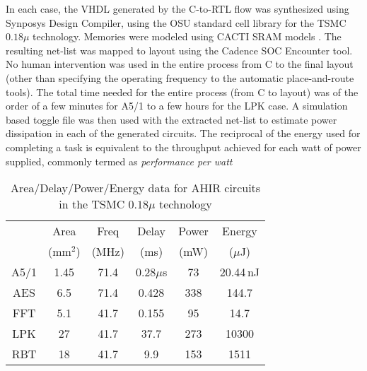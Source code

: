 \documentclass[conference]{IEEEtran}
\begin{document}
In each case, the VHDL generated by
the C-to-RTL flow was synthesized using Synposys Design Compiler,
using the OSU standard cell library \cite{OSU} for the TSMC $0.18\mu$ 
%
%
technology.  
Memories were modeled using CACTI SRAM models \cite{CACTI}. 
The resulting net-list was mapped to layout using
the Cadence SOC Encounter tool.  No human intervention was
used in the entire process from C to the final layout (other
than specifying the operating frequency to the automatic place-and-route
tools).   The total time needed for the entire process (from C to layout)
was of the order of a few minutes for A5/1 to a few hours for the LPK
case.
%
%
A simulation based toggle file was then used with the extracted
net-list to estimate power dissipation in each of the generated
circuits.
The reciprocal of the energy used for completing a task is equivalent to
the throughput achieved for each watt of power supplied, commonly
termed as {\em performance per watt} 
%

\begin{table}[htb]
  \centering
  \caption{Area/Delay/Power/Energy data for AHIR circuits in the TSMC $0.18\mu$ technology}
  \label{table:tsmc-180nm-data}
  \renewcommand\arraystretch{1.2}
  \setlength{\tabcolsep}{1ex}
  \begin{tabular}{c|c|c|c|c|c}
    \hline
    & Area & Freq & Delay & Power & Energy \\
    & (mm$^2$) & (MHz) & (ms) & (mW) & ($\mu$J) \\
    \hline
    \hline
    A5/1 & 1.45 & 71.4 & 0.28$\mu$s & 73 & 20.44\,nJ \\
    \hline
    AES & 6.5 & 71.4 & 0.428 & 338 & 144.7 \\
    \hline
    FFT & 5.1 & 41.7 & 0.155  & 95 & 14.7  \\
    \hline
    LPK & 27 & 41.7 & 37.7 & 273 & 10300  \\
    \hline
    RBT & 18 & 41.7 & 9.9 & 153 & 1511 \\
    \hline
  \end{tabular}

\end{table}
\end{document}
